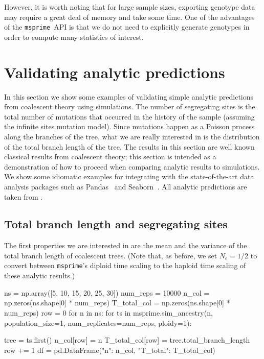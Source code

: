 \documentclass[graybox]{svmult}
\newcommand{\msprime}[0]{\texttt{msprime}}
\begin{document}
However, it is worth noting that for large sample sizes, exporting
genotype data may require a great deal of memory and take some time. One
of the advantages of the \msprime\ API is that we do not need to
explicitly generate genotypes in order to compute many
statistics of interest.

\section{Validating analytic predictions}\label{validating-analytical-predictions}

In this section we show some examples of validating simple analytic
predictions from coalescent theory using simulations. The number of
segregating sites is the total number of mutations that occurred in the
history of the sample (assuming the infinite sites mutation model).
Since mutations happen as a Poisson process along the branches of the
tree, what we are really interested in is the distribution of the total
branch length of the tree. The results in this section are well known
classical results from coalescent theory; this section is intended as a
demonstration of how to proceed when comparing analytic results to
simulations. We show some idiomatic examples for integrating with
the state-of-the-art data analysis packages such
as Pandas~\citep{mckinney2010data} and Seaborn~\citep{michael_waskom_2017_883859}.
All analytic predictions are taken from \cite{wakely2008coalescent}.

\subsection{Total branch length and segregating sites}
The first properties we are interested in are the mean and the
variance of the total branch length of coalescent trees. (Note that, as
before, we set \(N_e=1/2\) to convert between \msprime's diploid time
scaling to the haploid time scaling of these analytic results.)

\begin{pythoncode}
ns = np.array([5, 10, 15, 20, 25, 30])
num_reps = 10000
n_col = np.zeros(ns.shape[0] * num_reps)
T_total_col = np.zeros(ns.shape[0] * num_reps)
row = 0
for n in ns:
    for ts in msprime.sim_ancestry(n, population_size=1, num_replicates=num_reps, ploidy=1):

        tree = ts.first()
        n_col[row] = n
        T_total_col[row] = tree.total_branch_length
        row += 1
df = pd.DataFrame({"n": n_col, "T_total": T_total_col})
\end{pythoncode}
\end{document}
